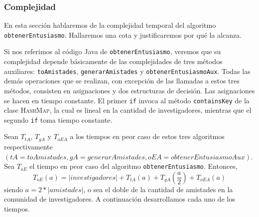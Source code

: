 \documentclass[12pt, a4paper,english,spanish]{article}
\begin{document}
\subsubsection*{Complejidad}
En esta secci\'on hablaremos de la complejidad temporal del algoritmo \texttt{obtenerEntusiasmo}. Hallaremos una cota y justificaremos por qu\'e la alcanza.

Si nos referimos al c\'odigo Java de \texttt{obtenerEntusiasmo}, veremos que su complejidad depende b\'asicamente de las complejidades de tres m\'etodos auxiliares: \texttt{toAmistades}, \texttt{generarAmistades} y \texttt{obtenerEntusiasmoAux}. Todas las dem\'as operaciones que se realizan, con excepci\'on de las llamadas a estos tres m\'etodos, consisten en asignaciones y dos estructuras de decisi\'on. Las asignaciones se hacen en tiempo constante. El primer \texttt{if} invoca al m\'etodo \texttt{containsKey} de la clase \textsc{HashMap}, la cual es lineal en la cantidad de investigadores\cite{java}, mientras que el segundo \texttt{if} toma tiempo constante.   

Sean $T_{tA}$, $T_{gA}$ y $T_{oEA}$ a los tiempos en peor caso de estos tres algoritmos respectivamente $(tA=toAmistades, gA=generarAmistades, oEA=obtenerEntusiasmoAux)$. Sea $T_{oE}$ el tiempo en peor caso del algoritmo \texttt{obtenerEntusiasmo}. Entonces, $$T_{oE}(a) = |investigadores| + T_{tA}(a) + T_{gA}\left(\frac{a}{2}\right) + T_{oEA}(a)$$ siendo $a = 2*|amistades|$, o sea el doble de la cantidad de amistades en la comunidad de investigadores. A continuaci\'on desarrollamos cada uno de los tiempos. 
\end{document}
